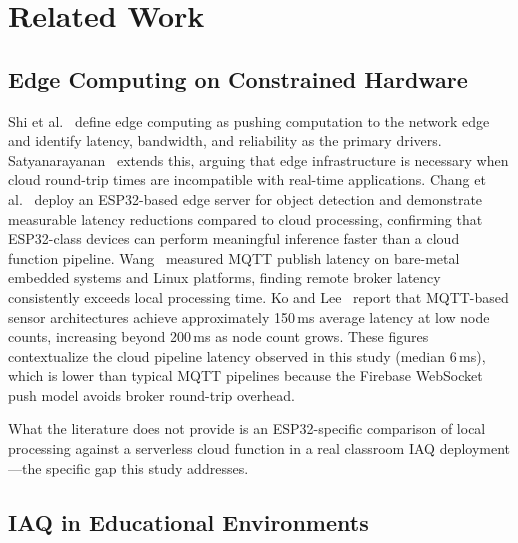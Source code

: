 \documentclass[12pt, a4paper]{article}
\newcommand{\ms}{\,ms}
\begin{document}
\section{Related Work}

\subsection{Edge Computing on Constrained Hardware}

Shi et al.~\cite{shi2016} define edge computing as pushing computation
to the network edge and identify latency, bandwidth, and reliability as
the primary drivers. Satyanarayanan~\cite{satya2017} extends this,
arguing that edge infrastructure is necessary when cloud round-trip
times are incompatible with real-time applications. Chang et
al.~\cite{chang2025} deploy an ESP32-based edge server for object
detection and demonstrate measurable latency reductions compared to
cloud processing, confirming that ESP32-class devices can perform
meaningful inference faster than a cloud function pipeline.
Wang~\cite{wang2021} measured MQTT publish latency on bare-metal
embedded systems and Linux platforms, finding remote broker latency
consistently exceeds local processing time. Ko and Lee~\cite{ko2025}
report that MQTT-based sensor architectures achieve approximately
150\ms{} average latency at low node counts, increasing beyond 200\ms{}
as node count grows. These figures contextualize the cloud pipeline
latency observed in this study (median 6\ms), which is lower than
typical MQTT pipelines because the Firebase WebSocket push model avoids
broker round-trip overhead.

What the literature does not provide is an ESP32-specific comparison
of local processing against a serverless cloud function in a real
classroom IAQ deployment---the specific gap this study addresses.

\subsection{IAQ in Educational Environments}
\end{document}
